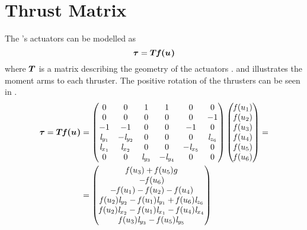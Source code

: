 \section{Thrust Matrix}
The \abbrROV's actuators can be modelled as
\begin{equation}
    \boldsymbol{\tau} = \boldsymbol{T} \boldsymbol{\mathit{f}(u_{})} 
\end{equation}
where $\boldsymbol{T}$ is a matrix describing the geometry of the actuators \citep[p.401]{fossen2011}.  and  illustrates the moment arms to each thruster. The positive rotation of the thrusters can be seen in .
\begin{equation}
\begin{split}
    \boldsymbol{\tau} = \boldsymbol{T} \boldsymbol{\mathit{f}(u_{})} 
    &=
    \begin{pmatrix}
    0& 0& 1& 1& 0& 0\\
    0& 0& 0&  0& 0& -1\\
    -1& -1& 0& 0& -1& 0\\
    \mathit{l}_{y_{1}} & -\mathit{l}_{y_{2}} & 0 &  0 &  0 & \mathit{l}_{z_{6}} \\
    \mathit{l}_{x_{1}} & \mathit{l}_{x_{2}} & 0 & 0 & -\mathit{l}_{x_{5}} & 0 \\
    0 & 0 & \mathit{l}_{y_{3}} & -\mathit{l}_{y_{4}} & 0 & 0 \\
    \end{pmatrix}
    \begin{pmatrix}
    \mathit{f}(u_{1}) \\
    \mathit{f}(u_{2}) \\
    \mathit{f}(u_{3}) \\
    \mathit{f}(u_{4}) \\
    \mathit{f}(u_{5}) \\
    \mathit{f}(u_{6}) \\
    \end{pmatrix}
    = \\
    &=\begin{pmatrix}
     \mathit{f}(u_{3}) + \mathit{f}(u_{5}) g \\
     -\mathit{f}(u_{6}) \\
     -\mathit{f}(u_{1}) - \mathit{f}(u_{2}) - \mathit{f}(u_{4}) \\
    \mathit{f}(u_{2}) \mathit{l}_{y_{2}} - \mathit{f}(u_{1}) \mathit{l}_{y_{1}} + \mathit{f}(u_{6}) \mathit{l}_{z_{6}} \\
    \mathit{f}(u_{2}) \mathit{l}_{x_{2}} - \mathit{f}(u_{1}) \mathit{l}_{x_{1}} - \mathit{f}(u_{4}) \mathit{l}_{x_{4}} \\
    \mathit{f}(u_{3}) \mathit{l}_{y_{3}} - \mathit{f}(u_{5}) \mathit{l}_{y_{5}} \\
    \end{pmatrix}
\end{split}
\end{equation}
